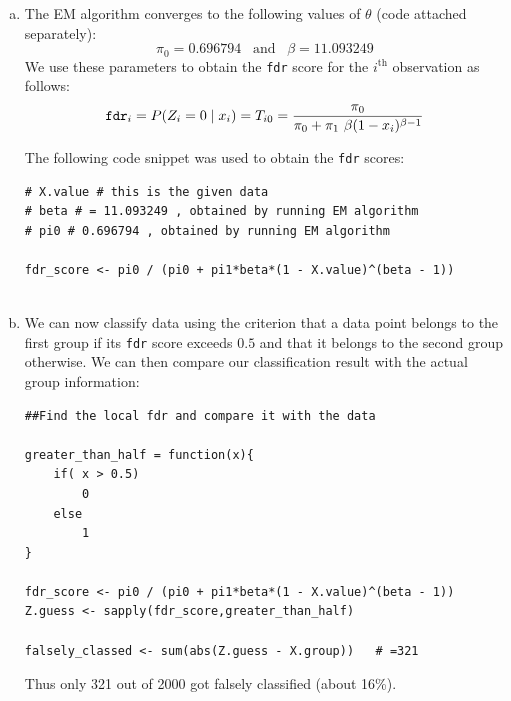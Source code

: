 \documentclass[12pt]{article}
\begin{document}
\begin{enumerate}[(a)]
\item
The EM algorithm converges to the following values of $\theta$ (code attached separately):
$$\boxed{
\pi_0 = 0.696794 \; \; \; \text{and} \; \; \; \beta = 11.093249 }
$$
We use these parameters to obtain the \texttt{fdr} score for the $i^{\text{th}}$ observation as follows:
$$
\text{\texttt{fdr}}_i  = P(Z_i = 0 \mid x_i) =  T_{i0} = \frac{\pi_0}{\pi_0 + \pi_1 \ \beta (1 - x_i)^{\beta - 1}}
$$

The following code snippet was used to obtain the \texttt{fdr} scores:
\begin{verbatim}
# X.value # this is the given data
# beta # = 11.093249 , obtained by running EM algorithm
# pi0 # 0.696794 , obtained by running EM algorithm

fdr_score <- pi0 / (pi0 + pi1*beta*(1 - X.value)^(beta - 1))  


\end{verbatim}

\item
We can now classify data using the criterion that a data point belongs to the first group if its \texttt{fdr} score exceeds $0.5$ and that it belongs to the second group otherwise. We can then compare our classification result with the actual group information:

\begin{verbatim}
##Find the local fdr and compare it with the data

greater_than_half = function(x){
    if( x > 0.5)
        0
    else
        1
}

fdr_score <- pi0 / (pi0 + pi1*beta*(1 - X.value)^(beta - 1))
Z.guess <- sapply(fdr_score,greater_than_half)

falsely_classed <- sum(abs(Z.guess - X.group))   # =321
\end{verbatim}

Thus only 321 out of 2000 got falsely classified (about 16\%). 

\end{enumerate}

\vspace{1000 mm}

\end{document}
